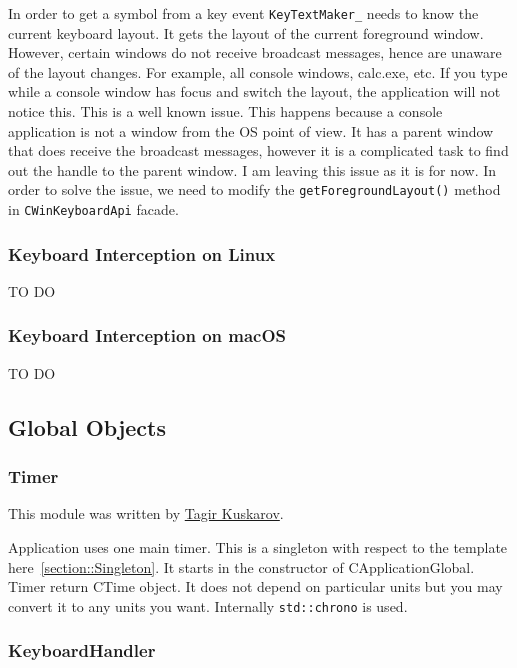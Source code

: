 \documentclass{article}
\begin{document}
In order to get a symbol from a key event \verb"KeyTextMaker_" needs to know the current keyboard layout. It gets the layout of the current foreground window. However, certain windows do not receive broadcast messages, hence are unaware of the layout changes. For example, all console windows, calc.exe, etc. If you type while a console window has focus and switch the layout, the application will not notice this. This is a well known issue. This happens because a console application is not a window from the OS point of view. It has a parent window that does receive the broadcast messages, however it is a complicated task to find out the handle to the parent window. I am leaving this issue as it is for now. In order to solve the issue, we need to modify the \verb"getForegroundLayout()" method in \verb"CWinKeyboardApi" facade.

\subsubsection{Keyboard Interception on Linux}

TO DO

\subsubsection{Keyboard Interception on macOS}

TO DO


\subsection{Global Objects}

\subsubsection{Timer}

This module was written by \href{https://github.com/kuskarov}{Tagir Kuskarov}. 

Application uses one main timer. This is a singleton with respect to the template here~\ref{section::Singleton}. It starts in the constructor of CApplicationGlobal. Timer return CTime object. It does not depend on particular units but you may convert it to any units you want. Internally \verb"std::chrono" is used.






\subsubsection{KeyboardHandler}\label{section::KeyboardHandler}
\end{document}
